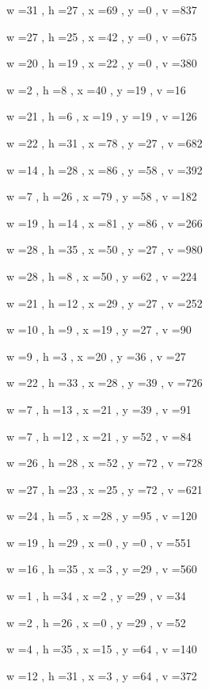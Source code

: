 \documentclass[11pt]{article}
\begin{document}
w =31 , h =27 , x =69 , y =0 , v =837
\par
w =27 , h =25 , x =42 , y =0 , v =675
\par
w =20 , h =19 , x =22 , y =0 , v =380
\par
w =2 , h =8 , x =40 , y =19 , v =16
\par
w =21 , h =6 , x =19 , y =19 , v =126
\par
w =22 , h =31 , x =78 , y =27 , v =682
\par
w =14 , h =28 , x =86 , y =58 , v =392
\par
w =7 , h =26 , x =79 , y =58 , v =182
\par
w =19 , h =14 , x =81 , y =86 , v =266
\par
w =28 , h =35 , x =50 , y =27 , v =980
\par
w =28 , h =8 , x =50 , y =62 , v =224
\par
w =21 , h =12 , x =29 , y =27 , v =252
\par
w =10 , h =9 , x =19 , y =27 , v =90
\par
w =9 , h =3 , x =20 , y =36 , v =27
\par
w =22 , h =33 , x =28 , y =39 , v =726
\par
w =7 , h =13 , x =21 , y =39 , v =91
\par
w =7 , h =12 , x =21 , y =52 , v =84
\par
w =26 , h =28 , x =52 , y =72 , v =728
\par
w =27 , h =23 , x =25 , y =72 , v =621
\par
w =24 , h =5 , x =28 , y =95 , v =120
\par
w =19 , h =29 , x =0 , y =0 , v =551
\par
w =16 , h =35 , x =3 , y =29 , v =560
\par
w =1 , h =34 , x =2 , y =29 , v =34
\par
w =2 , h =26 , x =0 , y =29 , v =52
\par
w =4 , h =35 , x =15 , y =64 , v =140
\par
w =12 , h =31 , x =3 , y =64 , v =372
\par
\newpage
\end{document}
